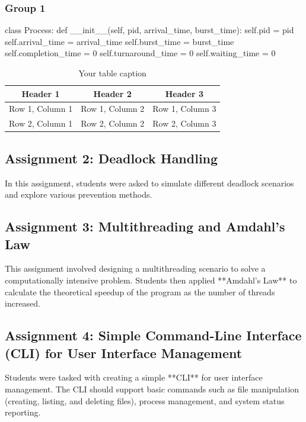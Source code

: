 \documentclass[12pt]{article}
\begin{document}
\subsubsection{Group 1}
\begin{python}
    class Process:
    def __init__(self, pid, arrival_time, burst_time):
        self.pid = pid
        self.arrival_time = arrival_time
        self.burst_time = burst_time
        self.completion_time = 0
        self.turnaround_time = 0
        self.waiting_time = 0
\end{python}

\begin{table}[htbp] %
    \centering
    \begin{tabular}{|c|c|c|} %
    \hline
    Header 1 & Header 2 & Header 3 \\ %
    \hline
    Row 1, Column 1 & Row 1, Column 2 & Row 1, Column 3 \\ %
    \hline
    Row 2, Column 1 & Row 2, Column 2 & Row 2, Column 3 \\ %
    \hline
    \end{tabular}
    \caption{Your table caption} %
    \label{tab:your_label} %
\end{table}

\subsection{Assignment 2: Deadlock Handling}
In this assignment, students were asked to simulate different deadlock scenarios and explore various prevention methods.

\subsection{Assignment 3: Multithreading and Amdahl's Law}
This assignment involved designing a multithreading scenario to solve a computationally intensive problem. Students then applied **Amdahl's Law** to calculate the theoretical speedup of the program as the number of threads increased.

\subsection{Assignment 4: Simple Command-Line Interface (CLI) for User Interface Management}
Students were tasked with creating a simple **CLI** for user interface management. The CLI should support basic commands such as file manipulation (creating, listing, and deleting files), process management, and system status reporting.
\end{document}
